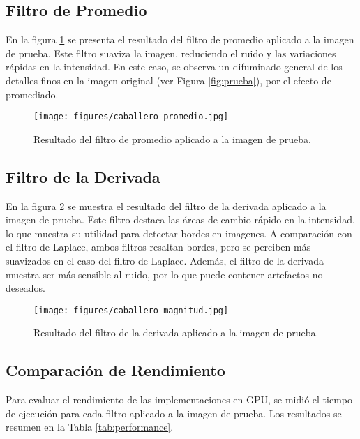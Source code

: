 \documentclass{pas}
\begin{document}
\subsection{Filtro de Promedio}

En la figura \ref{fig:average} se presenta el resultado del filtro de promedio aplicado a la imagen de prueba. Este filtro suaviza la imagen, reduciendo el ruido y las variaciones rápidas en la intensidad. En este caso, se observa un difuminado general de los detalles finos en la imagen original (ver Figura \ref{fig:prueba}), por el efecto de promediado.

\begin{figure}[H]
    \centering
    \texttt{[image: figures/caballero\_promedio.jpg]}
    \caption{Resultado del filtro de promedio aplicado a la imagen de prueba.}
    \label{fig:average}
\end{figure}


\subsection{Filtro de la Derivada}

En la figura \ref{fig:derivada} se muestra el resultado del filtro de la derivada aplicado a la imagen de prueba. Este filtro destaca las áreas de cambio rápido en la intensidad, lo que muestra su utilidad para detectar bordes en imagenes. A comparación con el filtro de Laplace, ambos filtros resaltan bordes, pero se perciben más suavizados en el caso del filtro de Laplace. Además, el filtro de la derivada muestra ser más sensible al ruido, por lo que puede contener artefactos no deseados. 

\begin{figure}[H]
    \centering
    \texttt{[image: figures/caballero\_magnitud.jpg]}
    \caption{Resultado del filtro de la derivada aplicado a la imagen de prueba.}
    \label{fig:derivada}
\end{figure}

\subsection{Comparación de Rendimiento}

Para evaluar el rendimiento de las implementaciones en GPU, se midió el tiempo de ejecución para cada filtro aplicado a la imagen de prueba. Los resultados se resumen en la Tabla \ref{tab:performance}.
\end{document}
